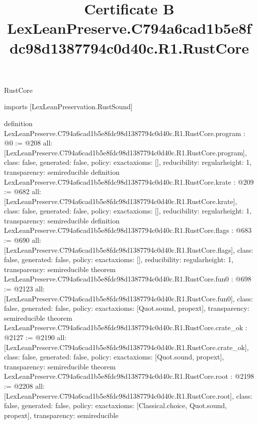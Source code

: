 \begin{lexlean}{RustCore}
\title{Certificate B LexLeanPreserve.C794a6cad1b5e8fdc98d1387794c0d40c.R1.RustCore}
\begin{coremodule}
imports [LexLeanPreservation.RustSound]

definition LexLeanPreserve.C794a6cad1b5e8fdc98d1387794c0d40c.R1.RustCore.program : @0 := @208 {
  all: [LexLeanPreserve.C794a6cad1b5e8fdc98d1387794c0d40c.R1.RustCore.program],
  class: false,
  generated: false,
  policy: exact{axioms: []},
  reducibility: regular{height: 1},
  transparency: semireducible
}
definition LexLeanPreserve.C794a6cad1b5e8fdc98d1387794c0d40c.R1.RustCore.krate : @209 := @682 {
  all: [LexLeanPreserve.C794a6cad1b5e8fdc98d1387794c0d40c.R1.RustCore.krate],
  class: false,
  generated: false,
  policy: exact{axioms: []},
  reducibility: regular{height: 1},
  transparency: semireducible
}
definition LexLeanPreserve.C794a6cad1b5e8fdc98d1387794c0d40c.R1.RustCore.flags : @683 := @690 {
  all: [LexLeanPreserve.C794a6cad1b5e8fdc98d1387794c0d40c.R1.RustCore.flags],
  class: false,
  generated: false,
  policy: exact{axioms: []},
  reducibility: regular{height: 1},
  transparency: semireducible
}
theorem LexLeanPreserve.C794a6cad1b5e8fdc98d1387794c0d40c.R1.RustCore.fun0 : @698 := @2123 {
  all: [LexLeanPreserve.C794a6cad1b5e8fdc98d1387794c0d40c.R1.RustCore.fun0],
  class: false,
  generated: false,
  policy: exact{axioms: [Quot.sound, propext]},
  transparency: semireducible
}
theorem LexLeanPreserve.C794a6cad1b5e8fdc98d1387794c0d40c.R1.RustCore.crate_ok : @2127 := @2190 {
  all: [LexLeanPreserve.C794a6cad1b5e8fdc98d1387794c0d40c.R1.RustCore.crate_ok],
  class: false,
  generated: false,
  policy: exact{axioms: [Quot.sound, propext]},
  transparency: semireducible
}
theorem LexLeanPreserve.C794a6cad1b5e8fdc98d1387794c0d40c.R1.RustCore.root : @2198 := @2208 {
  all: [LexLeanPreserve.C794a6cad1b5e8fdc98d1387794c0d40c.R1.RustCore.root],
  class: false,
  generated: false,
  policy: exact{axioms: [Classical.choice, Quot.sound, propext]},
  transparency: semireducible
}


\end{coremodule}
\end{lexlean}
